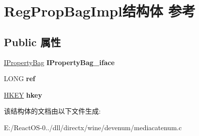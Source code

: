 \hypertarget{struct_reg_prop_bag_impl}{}\section{Reg\+Prop\+Bag\+Impl结构体 参考}
\label{struct_reg_prop_bag_impl}
\subsection*{Public 属性}
\begin{DoxyCompactItemize}
\item 
\mbox{\label{struct_reg_prop_bag_impl_ac3e8b736338fd25a54c9cea358369397}} 
\hyperlink{interface_i_property_bag}{I\+Property\+Bag} {\bfseries I\+Property\+Bag\+\_\+iface}
\item 
\mbox{\label{struct_reg_prop_bag_impl_a31b969b8d035e7ced7881927b4288d1d}} 
L\+O\+NG {\bfseries ref}
\item 
\mbox{\label{struct_reg_prop_bag_impl_a645e3099fed2a802594017ad0f3401df}} 
\hyperlink{interfacevoid}{H\+K\+EY} {\bfseries hkey}
\end{DoxyCompactItemize}


该结构体的文档由以下文件生成\+:\begin{DoxyCompactItemize}
\item 
E\+:/\+React\+O\+S-\/0../dll/directx/wine/devenum/mediacatenum.\+c\end{DoxyCompactItemize}
